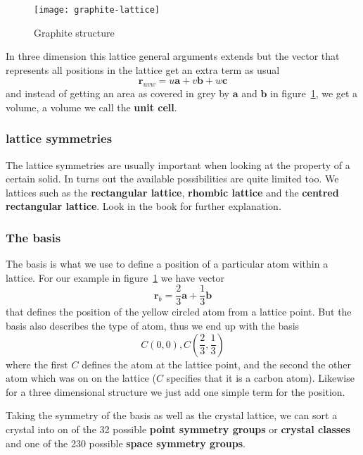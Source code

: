 \documentclass[11pt]{article}
\begin{document}
\begin{figure}[H]
	\centering
	\texttt{[image: graphite-lattice]}
	\caption{Graphite structure}
	\label{fig:graphite-lattice}
\end{figure}

In three dimension this lattice general arguments extends but the vector that represents all positions in the lattice get an extra term as usual
\begin{equation}
	\mathbf{r}_{uvw} = u\mathbf{a} + v\mathbf{b} + w\mathbf{c}
	\label{eq:crystal-lattice-3d}
\end{equation}
and instead of getting an area as covered in grey by $\mathbf{a}$ and $\mathbf{b}$ in figure~\ref{fig:graphite-lattice}, we get a volume, a volume we call the \textbf{unit cell}.

\subsubsection{lattice symmetries}
The lattice symmetries are usually important when looking at the property of a certain solid. In turns out the available possibilities are quite limited too. We lattices such as the \textbf{rectangular lattice}, \textbf{rhombic lattice} and the \textbf{centred rectangular lattice}. Look in the book for further explanation.

\subsubsection{The basis}\label{sec:basis}
The basis is what we use to define a position of a particular atom within a lattice. For our example in figure~\ref{fig:graphite-lattice} we have vector 
\begin{equation}
	\mathbf{r}_b = \frac{2}{3}\mathbf{a} + \frac{1}{3} \mathbf{b}
	\label{eq:basis}
\end{equation}
that defines the position of the yellow circled atom from a lattice point. But the basis also describes the type of atom, thus we end up with the basis 
\begin{equation}
	C(0,0),C(\frac{2}{3}, \frac{1}{3})
\end{equation}
where the first $C$ defines the atom at the lattice point, and the second the other atom which was on on the lattice ($C$ specifies that it is a carbon atom).
Likewise for a three dimensional structure we just add one simple term for the position. 

Taking the symmetry of the basis as well as the crystal lattice, we can sort a crystal into on of the 32 possible \textbf{point symmetry groups} or \textbf{crystal classes} and one of the 230 possible \textbf{space symmetry groups}.
\end{document}
